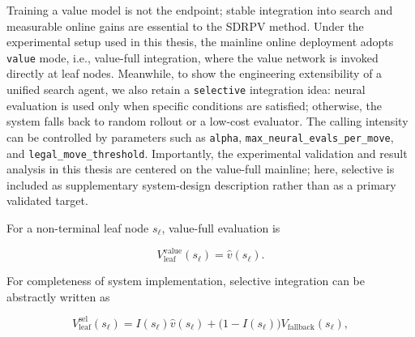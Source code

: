 Training a value model is not the endpoint; stable integration into search and measurable online gains are essential to the SDRPV method. Under the experimental setup used in this thesis, the mainline online deployment adopts \texttt{value} mode, i.e., value-full integration, where the value network is invoked directly at leaf nodes. Meanwhile, to show the engineering extensibility of a unified search agent, we also retain a \texttt{selective} integration idea: neural evaluation is used only when specific conditions are satisfied; otherwise, the system falls back to random rollout or a low-cost evaluator. The calling intensity can be controlled by parameters such as \texttt{alpha}, \texttt{max_neural_evals_per_move}, and \texttt{legal_move_threshold}. Importantly, the experimental validation and result analysis in this thesis are centered on the value-full mainline; here, selective is included as supplementary system-design description rather than as a primary validated target.

For a non-terminal leaf node $s_\ell$, value-full evaluation is

\begin{equation}
V_{\mathrm{leaf}}^{\mathrm{value}}(s_\ell)=\hat{v}(s_\ell).
\end{equation}


For completeness of system implementation, selective integration can be abstractly written as



\begin{equation}
V_{\mathrm{leaf}}^{\mathrm{sel}}(s_\ell)
=
I(s_\ell)\hat{v}(s_\ell)+\bigl(1-I(s_\ell)\bigr)V_{\mathrm{fallback}}(s_\ell),
\end{equation}

